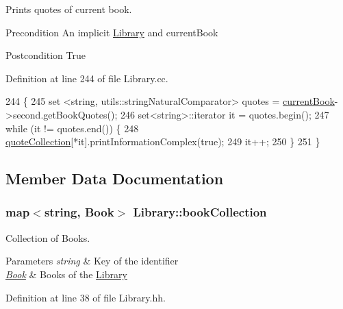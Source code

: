 Prints quotes of current book. 

\begin{DoxyPrecond}{Precondition}
An implicit \hyperlink{class_library}{Library} and current\+Book 
\end{DoxyPrecond}
\begin{DoxyPostcond}{Postcondition}
True 
\end{DoxyPostcond}


Definition at line 244 of file Library.\+cc.


\begin{DoxyCode}
244                                  \{
245     set <string, utils::stringNaturalComparator> quotes = \hyperlink{class_library_a78a4071e8d610da671b3886c71900dae}{currentBook}->second.getBookQuotes();
246     set<string>::iterator it = quotes.begin();
247     \textcolor{keywordflow}{while} (it != quotes.end()) \{
248         \hyperlink{class_library_a0f9136df5fc6e8901cb8524e026cb147}{quoteCollection}[*it].printInformationComplex(\textcolor{keyword}{true});
249         it++;
250     \}
251 \}
\end{DoxyCode}


\subsection{Member Data Documentation}
\subsubsection[{\texorpdfstring{book\+Collection}{bookCollection}}]{\setlength{\rightskip}{0pt plus 5cm}map$<$string, {\bf Book}$>$ Library\+::book\+Collection\hspace{0.3cm}{\ttfamily [private]}}\hypertarget{class_library_a5807d6d006ac0aa0a184831f0f2e5415}{}\label{class_library_a5807d6d006ac0aa0a184831f0f2e5415}


Collection of Books. 


\begin{DoxyParams}{Parameters}
{\em string} & Key of the identifier \\
\hline
{\em \hyperlink{class_book}{Book}} & Books of the \hyperlink{class_library}{Library} \\
\hline
\end{DoxyParams}


Definition at line 38 of file Library.\+hh.

